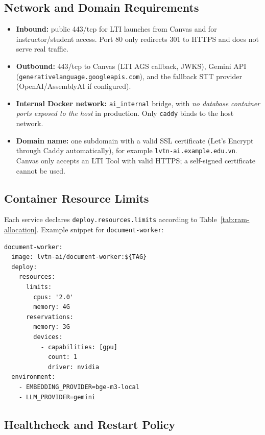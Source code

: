 \subsection{Network and Domain Requirements}
\label{appendix:network-req}

\begin{itemize}
    \item \textbf{Inbound:} public 443/tcp for LTI launches from Canvas
          and for instructor/student access. Port 80 only redirects
          301 to HTTPS and does not serve real traffic.
    \item \textbf{Outbound:} 443/tcp to Canvas (LTI AGS callback,
          JWKS), Gemini API
          (\texttt{generativelanguage.googleapis.com}), and the fallback
          STT provider (OpenAI/AssemblyAI if configured).
    \item \textbf{Internal Docker network:} \texttt{ai\_internal}
          bridge, with \textit{no database container ports exposed to
          the host} in production. Only \texttt{caddy} binds to the
          host network.
    \item \textbf{Domain name:} one subdomain with a valid SSL
          certificate (Let's Encrypt through Caddy automatically), for
          example \texttt{lvtn-ai.example.edu.vn}. Canvas only accepts
          an LTI Tool with valid HTTPS; a self-signed certificate cannot
          be used.
\end{itemize}

\subsection{Container Resource Limits}
\label{appendix:container-limits}

Each service declares \texttt{deploy.resources.limits} according to
Table~\ref{tab:ram-allocation}. Example snippet for
\texttt{document-worker}:

\begin{lstlisting}[caption={Resource limit for \texttt{document-worker}.}]
document-worker:
  image: lvtn-ai/document-worker:${TAG}
  deploy:
    resources:
      limits:
        cpus: '2.0'
        memory: 4G
      reservations:
        memory: 3G
        devices:
          - capabilities: [gpu]
            count: 1
            driver: nvidia
  environment:
    - EMBEDDING_PROVIDER=bge-m3-local
    - LLM_PROVIDER=gemini
\end{lstlisting}

\subsection{Healthcheck and Restart Policy}
\label{appendix:healthcheck}

